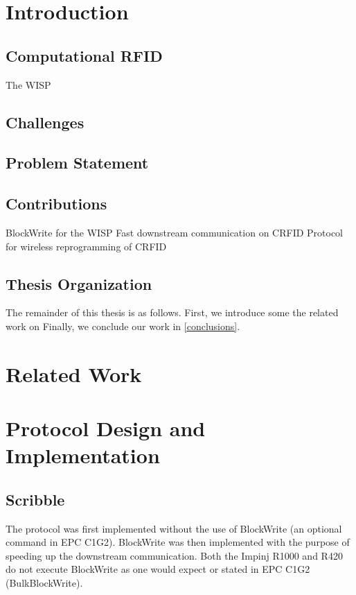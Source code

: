 \documentclass[11pt,twoside,a4paper,openright]{report}
\begin{document}
\tableofcontents

\cleardoublepage

\setcounter{page}{1}

\chapter{Introduction}
\label{intro}

\section{Computational RFID}
The WISP \cite{4539485}

\section{Challenges}

\section{Problem Statement}

\section{Contributions}
BlockWrite for the WISP
Fast downstream communication on CRFID
Protocol for wireless reprogramming of CRFID

\section{Thesis Organization}
The remainder of this thesis is as follows.
First, we introduce some the related work on 
Finally, we conclude our work in \cref{conclusions}.

\chapter{Related Work}
\label{relatedwork}


\chapter{Protocol Design and Implementation}
\label{design}

\section{Scribble}
The protocol was first implemented without the use of BlockWrite (an optional command in EPC C1G2).
BlockWrite was then implemented with the purpose of speeding up the downstream communication.
Both the Impinj R1000 and R420 do not execute BlockWrite as one would expect or stated in EPC C1G2 (BulkBlockWrite).
\end{document}
